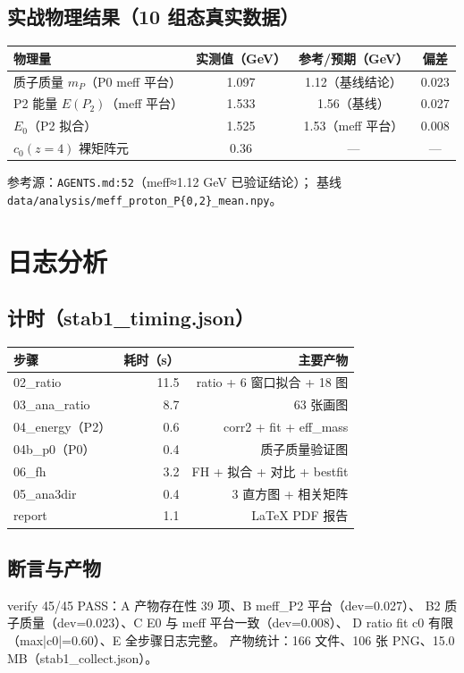 \documentclass[11pt]{article}
\begin{document}
\subsection{实战物理结果（10 组态真实数据）}
\begin{center}
\begin{tabular}{lccc}
\hline
物理量 & 实测值（GeV） & 参考/预期（GeV） & 偏差 \\
\hline
质子质量 $m_P$（P0 meff 平台） & 1.097 & 1.12（基线结论） & 0.023 \\
P2 能量 $E(P_2)$（meff 平台） & 1.533 & 1.56（基线） & 0.027 \\
$E_0$（P2 拟合） & 1.525 & 1.53（meff 平台） & 0.008 \\
$c_0(z{=}4)$ 裸矩阵元 & 0.36 & --- & --- \\
\hline
\end{tabular}
\end{center}
参考源：\texttt{AGENTS.md:52}（meff≈1.12 GeV 已验证结论）；
基线 \texttt{data/analysis/meff\_proton\_P\{0,2\}\_mean.npy}。

\section{日志分析}
\subsection{计时（stab1\_timing.json）}
\begin{center}
\begin{tabular}{lrr}
\hline
步骤 & 耗时（s） & 主要产物 \\
\hline
02\_ratio & 11.5 & ratio + 6 窗口拟合 + 18 图 \\
03\_ana\_ratio & 8.7 & 63 张画图 \\
04\_energy（P2） & 0.6 & corr2 + fit + eff\_mass \\
04b\_p0（P0） & 0.4 & 质子质量验证图 \\
06\_fh & 3.2 & FH + 拟合 + 对比 + bestfit \\
05\_ana3dir & 0.4 & 3 直方图 + 相关矩阵 \\
report & 1.1 & LaTeX PDF 报告 \\
\hline
\end{tabular}
\end{center}
\subsection{断言与产物}
verify 45/45 PASS：A 产物存在性 39 项、B meff\_P2 平台（dev=0.027）、
B2 质子质量（dev=0.023）、C E0 与 meff 平台一致（dev=0.008）、
D ratio fit c0 有限（max|c0|=0.60）、E 全步骤日志完整。
产物统计：166 文件、106 张 PNG、15.0 MB（stab1\_collect.json）。
\end{document}
